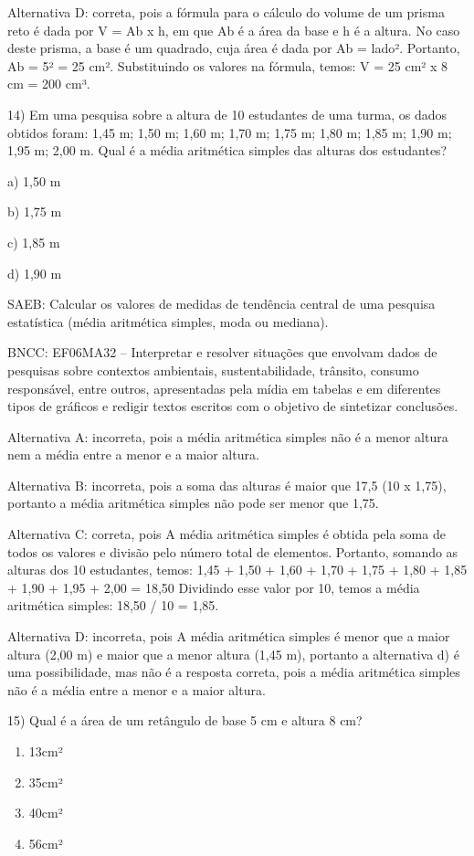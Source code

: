 Alternativa D: correta, pois a fórmula para o cálculo do volume de um
prisma reto é dada por V = Ab x h, em que Ab é a área da base e h é a
altura. No caso deste prisma, a base é um quadrado, cuja área é dada por
Ab = lado². Portanto, Ab = 5² = 25 cm². Substituindo os valores na
fórmula, temos: V = 25 cm² x 8 cm = 200 cm³.

14) Em uma pesquisa sobre a altura de 10 estudantes de uma turma, os
dados obtidos foram: 1,45 m; 1,50 m; 1,60 m; 1,70 m; 1,75 m; 1,80 m;
1,85 m; 1,90 m; 1,95 m; 2,00 m. Qual é a média aritmética simples das
alturas dos estudantes?

a) 1,50 m

b) 1,75 m

c) 1,85 m

d) 1,90 m

SAEB: Calcular os valores de medidas de tendência central de uma
pesquisa estatística (média aritmética simples, moda ou mediana).

BNCC: EF06MA32 -- Interpretar e resolver situações que envolvam dados de
pesquisas sobre contextos ambientais, sustentabilidade, trânsito,
consumo responsável, entre outros, apresentadas pela mídia em tabelas e
em diferentes tipos de gráficos e redigir textos escritos com o objetivo
de sintetizar conclusões.

Alternativa A: incorreta, pois a média aritmética simples não é a menor
altura nem a média entre a menor e a maior altura.

Alternativa B: incorreta, pois a soma das alturas é maior que 17,5 (10 x
1,75), portanto a média aritmética simples não pode ser menor que 1,75.

Alternativa C: correta, pois A média aritmética simples é obtida pela
soma de todos os valores e divisão pelo número total de elementos.
Portanto, somando as alturas dos 10 estudantes, temos: 1,45 + 1,50 +
1,60 + 1,70 + 1,75 + 1,80 + 1,85 + 1,90 + 1,95 + 2,00 = 18,50 Dividindo
esse valor por 10, temos a média aritmética simples: 18,50 / 10 = 1,85.

Alternativa D: incorreta, pois A média aritmética simples é menor que a
maior altura (2,00 m) e maior que a menor altura (1,45 m), portanto a
alternativa d) é uma possibilidade, mas não é a resposta correta, pois a
média aritmética simples não é a média entre a menor e a maior altura.

15) Qual é a área de um retângulo de base 5 cm e altura 8 cm?

\begin{enumerate}
\def\labelenumi{\alph{enumi})}
\item
  13cm²
\item
  35cm²
\item
  40cm²
\item
  56cm²
\end{enumerate}


